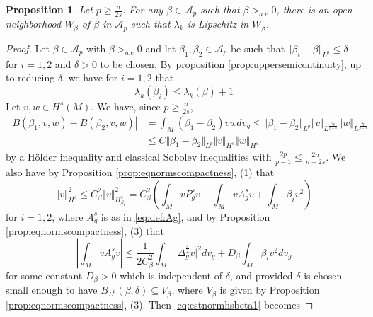 \documentclass[10pt]{amsart}
\numberwithin{equation}{section}
\theoremstyle{plain}
\newtheorem{prop}[theo]{Proposition}%
\theoremstyle{remark}
\begin{document}
\medskip

\begin{prop} \label{prop:lipeigen}
Let $p\geq \frac{n}{2s}$. For any $\beta \in \mathcal{A}_p$ such that $\beta>_{a.e}0$, there is an open neighborhood $W_\beta$ of $\beta$ in $\mathcal{A}_p$ such that $\lambda_k$ is Lipschitz in $W_\beta$.
\end{prop}

\begin{proof}
Let $\beta \in \mathcal{A}_p$ with $\beta>_{a.e}0$ and let $\beta_1, \beta_2 \in  \mathcal{A}_p$ be such that $\Vert \beta_i -\beta \Vert_{L^p} \leq \delta$ for $i=1,2$ and $\delta>0$ to be chosen. By proposition \ref{prop:uppersemicontinuity}, up to reducing $\delta$, we have for $i=1,2$ that 
\begin{equation}\label{eq:boundlambdakbetai} \lambda_k(\beta_i)\leq \lambda_k(\beta)+1 \end{equation}
Let $v,w\in H^s(M)$. We have, since $p \ge \frac{n}{2s}$,
\begin{equation} \label{eq:beta1minusbeta2}\begin{split}\left\vert B(\beta_1,v,w) - B(\beta_2,v,w) \right\vert & = \int_M \left( \beta_1-\beta_2 \right)v w dv_g \leq \Vert \beta_1-\beta_2  \Vert_{L^p} \Vert v \Vert_{L^{\frac{2p}{p-1}}} \Vert w \Vert_{L^{\frac{2p}{p-1}}} \\ 
& \leq C \Vert \beta_1-\beta_2  \Vert_{L^p} \Vert v \Vert_{H^s} \Vert w \Vert_{H^s} \end{split}\end{equation}
by a H\"older inequality and classical Sobolev inequalities with $\frac{2p}{p-1} \leq \frac{2n}{n-2s}$. We also have by Proposition \ref{prop:eqnormscompactness}, (1) that
\begin{equation}\label{eq:estnormhsbeta1} \Vert v \Vert_{H^s}^2 \leq C_\beta^2 \Vert v \Vert_{H^s_{\beta_1}}^2 = C_\beta^2 \left( \int_M v P_g^s v - \int_M v A_g^s v + \int_M \beta_i v^2 \right)  \end{equation}
for $i=1,2$, where $A_g^s$ is as in \eqref{eq:def:Ag}, and by Proposition \ref{prop:eqnormscompactness}, (3) that 
$$ \left\vert \int_M v A_g^s v \right\vert \leq \frac{1}{2 C_\beta^2} \int_M \vert \Delta_g^{\frac{s}{2}} v \vert^2 dv_g + D_\beta \int_M \beta_i v^2 dv_g $$
for some constant $D_\beta >0$ %
which is independent of $\delta$, and provided $\delta$ is chosen small enough to have $B_{L^p}(\beta,\delta) \subseteq V_\beta$, where $V_\beta$ is given by Proposition \ref{prop:eqnormscompactness}, (3). Then \eqref{eq:estnormhsbeta1} becomes

\end{proof}
\end{document}
